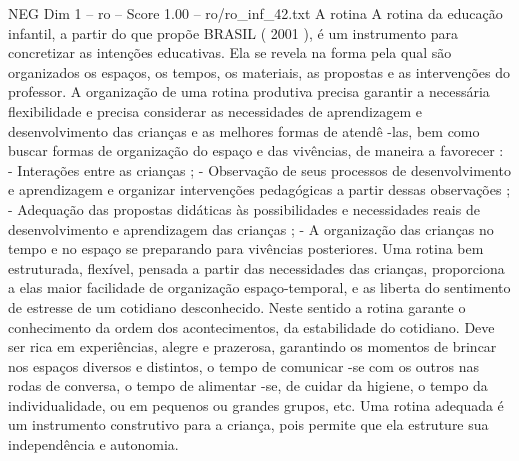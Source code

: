 \begin{textsample}{NEG Dim 1 – ro – Score 1.00 – ro/ro\_inf\_42.txt}  \label{ex:f1_neg_152}
A rotina A rotina da educação infantil, a partir do que propõe BRASIL ( 2001 ), é um instrumento para concretizar as intenções educativas.
Ela se revela na forma pela qual são organizados os espaços, os tempos, os materiais, as propostas e as intervenções do professor.
A organização de uma rotina produtiva precisa garantir a necessária flexibilidade e precisa considerar as necessidades de aprendizagem e desenvolvimento das crianças e as melhores formas de atendê -las, bem como buscar formas de organização do espaço e das vivências, de maneira a favorecer : - Interações entre as crianças ; - Observação de seus processos de desenvolvimento e aprendizagem e organizar intervenções pedagógicas a partir dessas observações ; - Adequação das propostas didáticas às possibilidades e necessidades reais de desenvolvimento e aprendizagem das crianças ; - A organização das crianças no tempo e no espaço se preparando para vivências posteriores.
Uma rotina bem estruturada, flexível, pensada a partir das necessidades das crianças, proporciona a elas maior facilidade de organização espaço-temporal, e as liberta do sentimento de estresse de um cotidiano desconhecido.
Neste sentido a rotina garante o conhecimento da ordem dos acontecimentos, da estabilidade do cotidiano.
Deve ser rica em experiências, alegre e prazerosa, garantindo os momentos de brincar nos espaços diversos e distintos, o tempo de comunicar -se com os outros nas rodas de conversa, o tempo de alimentar -se, de cuidar da higiene, o tempo da individualidade, ou em pequenos ou grandes grupos, etc.
Uma rotina adequada é um instrumento construtivo para a criança, pois permite que ela estruture sua independência e autonomia.

\end{textsample}
